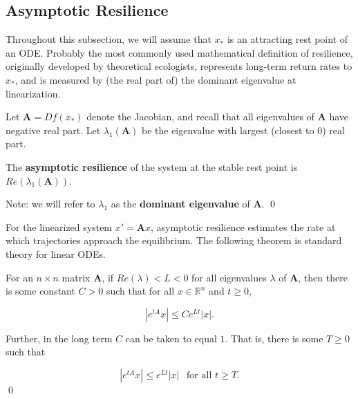 \subsection{Asymptotic Resilience}

Throughout this subsection, we will assume that $x_\ast$ is an attracting rest point of an ODE. Probably the most commonly used mathematical definition of resilience,  originally developed by theoretical ecologists, represents long-term return rates to $x_{\ast}$, and is measured by (the real part of) the dominant eigenvalue at linearization. 

\begin{definition}
	\label{def:asymp}
	 Let $\textbf{A} = Df(x_\ast)$ denote the Jacobian, and recall that all eigenvalues of $\mathbf{A}$ have negative real part. Let $\lambda_1(\textbf{A})$ be the eigenvalue with largest (closest to 0) real part. 
	
	\begin{center}
	The \textbf{asymptotic resilience} of the system at the stable rest point is $Re(\lambda_1(\textbf{A}))$.
	\end{center}
Note: we will refer to $\lambda_1$ as the \textbf{dominant eigenvalue} of $\mathbf{A}$. 
	 \qed 
\end{definition}

For the linearized system $x'= \textbf{A}x$, asymptotic resilience estimates the rate at which trajectories approach the equilibrium. The following theorem is standard theory for linear ODEs. %


\begin{theorem}
	For an $n \times n$ matrix $\mathbf{A}$, if $Re(\lambda) < L < 0$ for all eigenvalues $\lambda$ of $\mathbf{A}$, then there is some constant $C>0$ such that for all $x \in \mathbb{R}^n$ and $t \geq 0$,
	
	$$|e^{tA}x| \leq Ce^{L t}|x|.$$ 
	
	Further, in the long term $C$ can be taken to equal $1$. That is, there is some $T \geq 0$ such that
	
	$$|e^{tA}x| \leq e^{L t}|x| ~ ~\text{ for all } t \geq T.$$ \qed
\end{theorem}

%	


